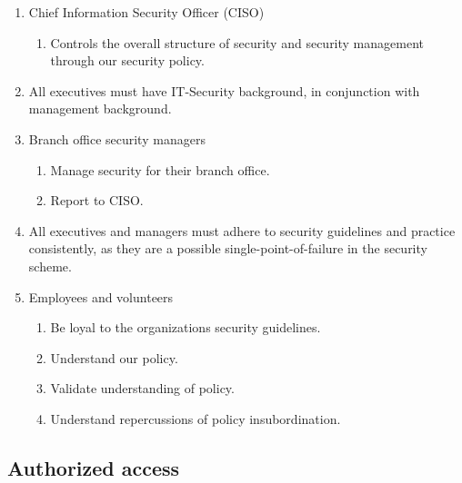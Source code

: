 \begin{enumerate}
  \item Chief Information Security Officer (CISO)
  \begin{enumerate}
    \item Controls the overall structure of security and security management through our security policy.
  \end{enumerate}
  \item All executives must have IT-Security background, in conjunction with management background.
  \item Branch office security managers
  \begin{enumerate}
     \item Manage security for their branch office.
     \item Report to CISO.
  \end{enumerate}
  \item All executives and managers must adhere to security guidelines and practice consistently, as they are a possible single-point-of-failure in the security scheme.
  \item Employees and volunteers
  \begin{enumerate}
    \item Be loyal to the organizations security guidelines.
    \item Understand our policy.
    \item Validate understanding of policy.
    \item Understand repercussions of policy insubordination.
  \end{enumerate}
\end{enumerate}

\subsection{Authorized access}

